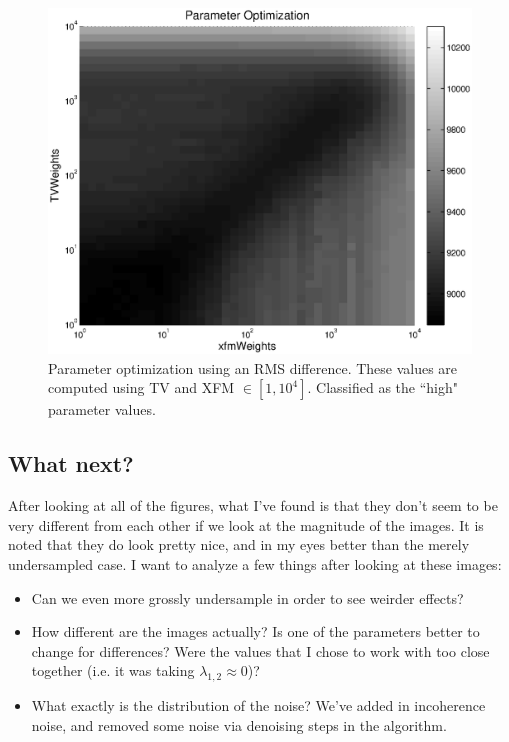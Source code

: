 \documentclass[11 pt]{article}
\begin{document}
    \begin{figure}[!ht] 
      \centering
      \vspace{0pt}
      \setlength\fboxsep{0pt}
      \setlength\fboxrule{0.5pt}
      \includegraphics[trim = {0mm 0mm 0mm 0mm},clip,scale = 0.4] {Figs/CS_Code/ParamOptimization-HighTVxfm.eps}
      \caption{Parameter optimization using an RMS difference. These values are computed using TV and XFM $\in [1,10^{4}]$. Classified as the ``high" parameter values.}
      \label{fig:lamOptHigh}
      \end{figure}

  \subsection{What next?}
    After looking at all of the figures, what I've found is that they don't seem to be very different from each other if we look at the magnitude of the images. It is noted that they do look pretty nice, and in my eyes better than the merely undersampled case. I want to analyze a few things after looking at these images:
    
    \begin{itemize}
      \item Can we even more grossly undersample in order to see weirder effects?
      
      \item How different are the images actually? Is one of the parameters better to change for differences? Were the values that I chose to work with too close together (i.e. it was taking $\lambda_{1,2} \approx 0$)?

      \item What exactly is the distribution of the noise? We've added in incoherence noise, and removed some noise via denoising steps in the algorithm.

      \end{itemize}
\end{document}
